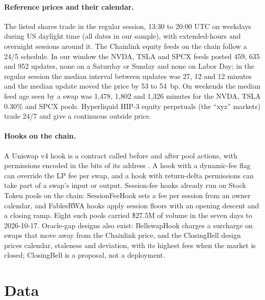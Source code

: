 \documentclass[11pt]{article}
\newcommand{\USD}{\$}
\begin{document}
\paragraph{Reference prices and their calendar.} The listed shares trade in the regular session, 13:30 to 20:00 UTC on weekdays during US daylight time (all dates in our sample), with extended-hours and overnight sessions around it. The Chainlink equity feeds on the chain follow a 24/5 schedule. In our window the NVDA, TSLA and SPCX feeds posted 459, 635 and 952 updates, none on a Saturday or Sunday and none on Labor Day; in the regular session the median interval between updates was 27, 12 and 12 minutes and the median update moved the price by 53 to 54~bp. On weekends the median feed age seen by a swap was 1,478, 1,802 and 1,326 minutes for the NVDA, TSLA 0.30\% and SPCX pools. Hyperliquid HIP-3 equity perpetuals (the ``xyz'' markets) trade 24/7 and give a continuous outside price.

\paragraph{Hooks on the chain.} A Uniswap v4 hook is a contract called before and after pool actions, with permissions encoded in the bits of its address \citep{adams2024v4}. A hook with a dynamic-fee flag can override the LP fee per swap, and a hook with return-delta permissions can take part of a swap's input or output. Session-fee hooks already run on Stock Token pools on the chain: SessionFeeHook sets a fee per session from an owner calendar, and FablesRWA hooks apply session floors with an opening descent and a closing ramp. Eight such pools carried \USD27.5M of volume in the seven days to 2026-10-17. Oracle-gap designs also exist: BellswapHook charges a surcharge on swaps that move away from the Chainlink price, and the ClosingBell design prices calendar, staleness and deviation, with its highest fees when the market is closed; ClosingBell is a proposal, not a deployment.

\section{Data}\label{sec:data}
\end{document}
